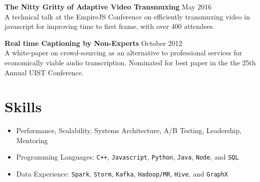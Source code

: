 \documentclass[oneside, final]{scrartcl}
\newcommand{\lang}[1]{\colorbox{light-gray}{\texttt{#1}}}
\begin{document}
\begin{center}
\begin{flushleft}

    \textbf{The Nitty Gritty of Adaptive Video Transmuxing} \hfill May  2016\\
    A technical talk at the EmpireJS Conference on efficiently transmuxing video in javascript for improving time to first frame, with over 400 attendees.

    \vspace{10pt}

    \textbf{Real time Captioning by Non-Experts} \hfill October  2012\\
    A white-paper on crowd-sourcing as an alternative to professional services for economically viable audio transcription. Nominated for best paper in the the 25th Annual UIST Conference.


\end{flushleft}



    \section{Skills}
    \begin{itemize}
        \setlength{\itemsep}{1pt}
        \setlength{\parskip}{0pt}
        \setlength{\parsep}{0pt}
        \setlength{\leftmargin}{-5mm}
        \item Performance, Scalability, Systems Architecture, A/B Testing, Leadership, Mentoring
          \vspace{2pt}

        \item Programming Languages:
            \lang{C++},
            \lang{Javascript},
            \lang{Python},
            \lang{Java},
            \lang{Node}, and
            \lang{SQL} \\
        \item Data Experience: 
            \lang{Spark},
            \lang{Storm},
            \lang{Kafka},
            \lang{Hadoop/MR},
            \lang{Hive}, and
            \lang{GraphX} \\
            
       \begin{comment}


\end{comment}
\end{itemize}
\end{center}
\end{document}

